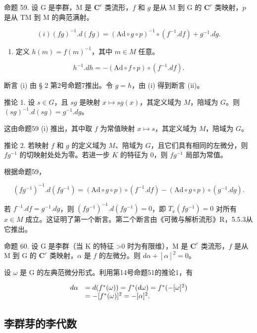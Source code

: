 命题 59. 设 G 是李群，M 是 \(\mathbf{C}^r\) 类流形，\(f\) 和 \(g\) 是从 M 到 G 的 \(\mathbf{C}^r\) 类映射，\(p\) 是从 TM 到 M 的典范满射。

\[
(i) (f g) ^ {- 1}. d (f g) = (\mathrm{Ad} \circ g \circ p) ^ {- 1} \circ (f ^ {- 1}. d f) + g ^ {- 1}. d g.
\]

\begin{enumerate}
\def\labelenumi{(\roman{enumi})}
\setcounter{enumi}{1}
\tightlist
\item
  定义 \(h(m) = f(m)^{-1}\)，其中 \(m \in M\) 任意。
\end{enumerate}

\[
h ^ {- 1}. d h = - (\mathrm{Ad} \circ f \circ p) \circ (f ^ {- 1}. d f).
\]

断言 (i) 由 § 2 第2号命题7推出。令 \(g = h\)，由 (i) 得到断言 (ii)。

推论 1. 设 \(s \in G\)，且 \(sg\) 是映射 \(x \mapsto sg(x)\)，其定义域为 \(M\)，陪域为 \(G\)。则 \((sg)^{-1}.d(sg) = g^{-1}.dg\)。

这由命题59 (i) 推出，其中取 \(f\) 为常值映射 \(x \mapsto s\)，其定义域为 \(M\)，陪域为 \(G\)。

推论 2. 若映射 \(f\) 和 \(g\) 的定义域为 \(M\)、陪域为 \(G\)，且它们具有相同的左微分，则 \(fg^{-1}\) 的切映射处处为零。若进一步 \(K\) 的特征为 0，则 \(fg^{-1}\) 局部为常值。

根据命题59，

\[
(f g ^ {- 1}) ^ {- 1}. d (f g ^ {- 1}) = (\mathrm{Ad} \circ g \circ p) \circ (f ^ {- 1}. d f) - (\mathrm{Ad} \circ g \circ p) \circ (g ^ {- 1}. d g).
\]

若 \(f^{-1}.df = g^{-1}.dg\)，则 \((fg^{-1})^{-1}.d(fg^{-1}) = 0\)，即 \(T_x(fg^{-1}) = 0\) 对所有 \(x \in M\) 成立。这证明了第一个断言。第二个断言由《可微与解析流形》R，5.5.3从它推出。

命题 60. 设 G 是李群（当 K 的特征 \textgreater0 时为有限维），M 是 \(\mathbf{C}^r\) 类流形，\(f\) 是从 M 到 G 的 \(\mathbf{C}^r\) 类映射，\(\alpha\) 是 \(f\) 的左微分。则 \(d\alpha + [\alpha]^2 = 0\)。

设 \(\omega\) 是 G 的左典范微分形式。利用第14号命题51的推论1，有

\[
\begin{array}{r l} d \alpha & = d (f ^ {*} (\omega)) = f ^ {*} (d \omega) = f ^ {*} (- [ \omega ] ^ {2}) \\ & = - [ f ^ {*} (\omega) ] ^ {2} = - [ \alpha ] ^ {2}. \end{array}
\]

\subsection{李群芽的李代数}

